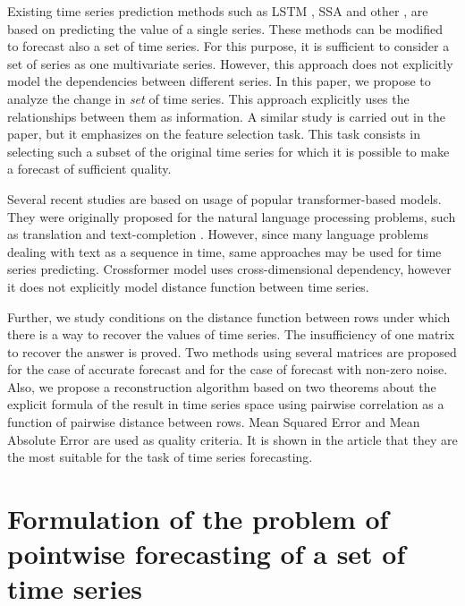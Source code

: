 \documentclass{article}
\begin{document}
	Existing time series prediction methods such as LSTM \cite{LSTM}, SSA \cite{SSA} and other \cite{Biosignals}, \cite{boyd2017multiperiod} are based on predicting the value of a single series. These methods can be modified to forecast also a set of time series. For this purpose, it is sufficient to consider a set of series as one multivariate series. However, this approach does not explicitly model the dependencies between different series. In this paper, we propose to analyze the change in \textit{set} of time series. This approach explicitly uses the relationships between them as information. A similar study is carried out in the \cite{MulticorrelatedQuadratic} paper, but it emphasizes on the feature selection task. This task consists in selecting such a subset of the original time series for which it is possible to make a forecast of sufficient quality.
	
	Several recent studies \cite{haoyietal-informer-2021} \cite{haoyietal-informerEx-2023} \cite{wu2021autoformer} \cite{liu2022pyraformer} are based on usage of popular transformer-based models. They were originally proposed for the natural language processing problems, such as translation and text-completion \cite{NIPS2017_3f5ee243}. However, since many language problems dealing with text as a sequence in time, same approaches may be used for time series predicting. Crossformer \cite{zhang2023crossformer} model uses cross-dimensional dependency, however it does not explicitly model distance function between time series.
	
	Further, we study conditions on the distance function between rows under which there is a way to recover the values of time series. The insufficiency of one matrix to recover the answer is proved. Two methods using several matrices are proposed for the case of accurate forecast and for the case of forecast with non-zero noise. Also, we propose a reconstruction algorithm based on two theorems about the explicit formula of the result in time series space using pairwise correlation as a function of pairwise distance between rows. Mean Squared Error and Mean Absolute Error are used as quality criteria. It is shown in the article \cite{jadon2022comprehensive} that they are the most suitable for the task of time series forecasting.

\section{Formulation of the problem of pointwise forecasting of a set of time series}
\end{document}
